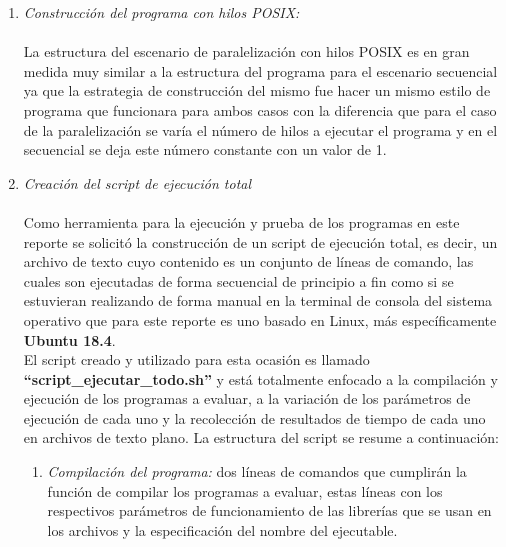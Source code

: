 \documentclass[a4paper,10pt]{IEEEtran}
\begin{document}
\begin{enumerate}
    \item \textit{Construcci\'on del programa con hilos POSIX:} \\ \\
    La estructura del escenario de paralelizaci\'on con hilos POSIX es en gran medida muy similar a la estructura del programa para el escenario secuencial ya que la estrategia de construcci\'on del mismo fue hacer un mismo estilo de programa que funcionara para ambos casos con la diferencia que para el caso de la paralelizaci\'on se var\'ia el n\'umero de hilos a ejecutar el programa y en el secuencial se deja este n\'umero constante con un valor de 1. \\
    
    \item \textit{Creaci\'on del script de ejecuci\'on total} \\ \\
    Como herramienta para la ejecuci\'on y prueba de los programas en este reporte se solicit\'o la construcci\'on de un script de ejecución total, es decir, un archivo de texto cuyo contenido es un conjunto de l\'ineas de comando, las cuales son ejecutadas de forma secuencial de principio a fin como si se estuvieran realizando de forma manual en la terminal de consola del sistema operativo que para este reporte es uno basado en Linux, más
    espec\'ificamente \textbf{Ubuntu 18.4}. \\

    El script creado y utilizado para esta ocasi\'on es llamado
    \textbf{“script\_ejecutar\_todo.sh”} y est\'a totalmente enfocado a la compilaci\'on y ejecuci\'on de los programas a evaluar, a la variaci\'on de los par\'ametros de ejecuci\'on de cada uno y la recolecci\'on de resultados de tiempo de cada uno en archivos de texto plano. La estructura del script se resume a continuación:
    
    \begin{enumerate}
        \item \textit{Compilaci\'on del programa:} dos l\'ineas de comandos que cumplir\'an la funci\'on de compilar los programas a evaluar, estas l\'ineas con los respectivos par\'ametros de funcionamiento de las librer\'ias que se usan en los archivos y la especificaci\'on del nombre
        del ejecutable. \\
        

\end{enumerate}
\end{enumerate}
\end{document}
